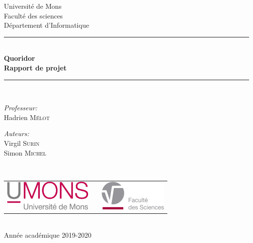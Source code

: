 \documentclass[a4paper, 12pt]{article}
\begin{document}
\begin{titlepage}
\begin{center}

{\Large Université de Mons}\\[1ex]
{\Large Faculté des sciences}\\[1ex]
{\Large Département d'Informatique}\\[2.5cm]

\newcommand{\HRule}{\rule{\linewidth}{0.3mm}}
\HRule \\[0.3cm]
{ \LARGE \bfseries Quoridor \\[0.3cm]}
{ \LARGE \bfseries Rapport de projet \\[0.1cm]} %
\HRule \\[1.5cm]

\begin{minipage}[t]{0.45\textwidth}
\begin{flushleft} \large
\emph{Professeur:}\\
Hadrien \textsc{Mélot}\\
\end{flushleft}
\end{minipage}
\begin{minipage}[t]{0.45\textwidth}
\begin{flushright} \large
\emph{Auteurs:} \\
Virgil \textsc{Surin} \\
Simon \textsc{Michel}
\end{flushright}
\end{minipage}\\[2ex]

\vfill

\begin{center}
\begin{tabular}[t]{c c c}
\includegraphics[height=1.5cm]{logoumons.jpg} &
\hspace{0.3cm} &
\includegraphics[height=1.5cm]{logofs.jpg}
\end{tabular}
\end{center}~\\
 
{\large Année académique 2019-2020}

\end{center}
\end{titlepage}
\end{document}
